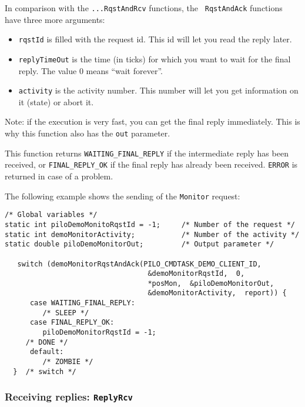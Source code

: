 In comparison with the {\tt ...RqstAndRcv} functions, the {\tt
RqstAndAck} functions have three more arguments:

\begin{itemize}
\item {\tt rqstId} is filled with the request id. This id will let you
read the reply later.

\item {\tt replyTimeOut} is the time (in ticks) for which you want to
wait for the final reply. The value $0$ means ``wait forever''. 

\item {\tt activity} is the activity number. This number will let you get
information on it (state) or abort it.
\end{itemize}

Note: if    the execution is  very   fast, you can   get the  final reply
immediately. This is why this function also has the {\tt out} parameter.

This function returns {\tt   WAITING\_FINAL\_REPLY} if the   intermediate
reply has been received, or {\tt FINAL\_REPLY\_OK} if the final reply has
already been received. {\tt ERROR} is returned in case of a problem.

\bigbreak

The following example shows the sending of the {\tt Monitor} request:

\begin{center}\begin{cartouche}\small\begin{verbatim}
/* Global variables */
static int piloDemoMonitoRqstId = -1;     /* Number of the request */
static int demoMonitorActivity;           /* Number of the activity */
static double piloDemoMonitorOut;         /* Output parameter */

   switch (demoMonitorRqstAndAck(PILO_CMDTASK_DEMO_CLIENT_ID, 
                                  &demoMonitorRqstId,  0,
                                  *posMon,  &piloDemoMonitorOut, 
                                  &demoMonitorActivity,  report)) {
      case WAITING_FINAL_REPLY:
         /* SLEEP */
      case FINAL_REPLY_OK:
         piloDemoMonitorRqstId = -1;
	 /* DONE */
      default:
         /* ZOMBIE */
  }  /* switch */
\end{verbatim}\end{cartouche}\end{center}


\subsubsection{Receiving replies: {\tt ReplyRcv}}

